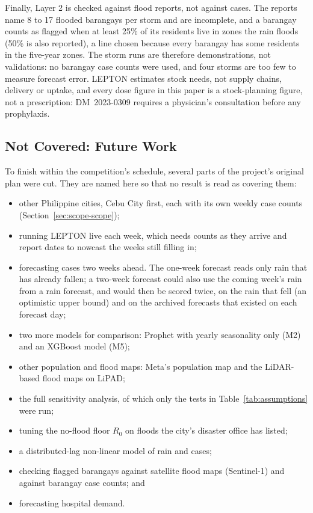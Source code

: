 Finally, Layer 2 is checked against flood reports, not against cases. The reports name 8 to 17
flooded barangays per storm and are incomplete, and a barangay counts as flagged when at least
25\% of its residents live in zones the rain floods (50\% is also reported), a line chosen
because every barangay has some residents in the five-year zones. The storm runs are therefore
demonstrations, not
validations: no barangay case counts were used, and four storms are too few to measure forecast
error. LEPTON estimates stock needs, not supply chains, delivery or uptake, and every dose
figure in this paper is a stock-planning figure, not a prescription: DM~\mbox{2023-0309} requires a
physician's consultation before any prophylaxis.

\subsection{Not Covered: Future Work}\label{sec:future}

To finish within the competition's schedule, several parts of the project's original plan were
cut. They are named here so that no result is read as covering them:
\begin{itemize}
  \item other Philippine cities, Cebu City first, each with its own weekly case counts
    (Section~\ref{sec:scope-scope});
  \item running LEPTON live each week, which needs counts as they arrive and report dates to
    nowcast the weeks still filling in;
  \item forecasting cases two weeks ahead. The one-week forecast reads only rain that has
    already fallen; a two-week forecast could also use the coming week's rain from a rain
    forecast, and would then be scored twice, on the rain that fell (an optimistic upper bound)
    and on the archived forecasts that existed on each forecast day;
  \item two more models for comparison: Prophet with yearly seasonality only (M2) and an
    XGBoost model (M5);
  \item other population and flood maps: Meta's population map and the LiDAR-based flood maps
    on LiPAD;
  \item the full sensitivity analysis, of which only the tests in Table~\ref{tab:assumptions}
    were run;
  \item tuning the no-flood floor $R_0$ on floods the city's disaster office has listed;
  \item a distributed-lag non-linear model of rain and cases;
  \item checking flagged barangays against satellite flood maps (Sentinel-1) and against
    barangay case counts; and
  \item forecasting hospital demand.
\end{itemize}
